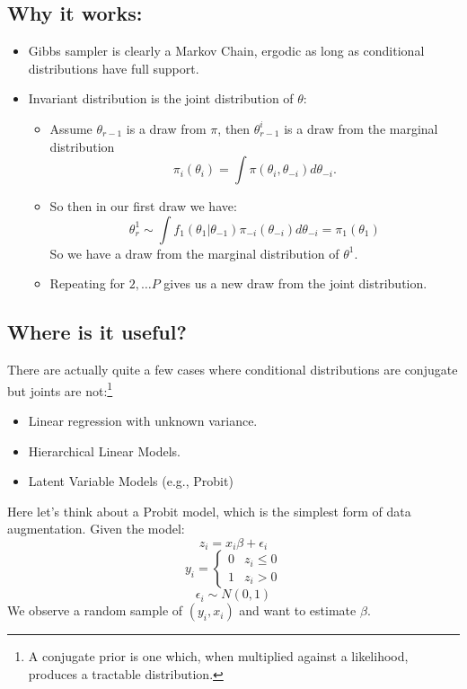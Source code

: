 \documentclass[twoside]{article}
\begin{document}
\subsection{Why it works:} 
\begin{itemize}
\item Gibbs sampler is clearly a Markov Chain, ergodic as long as conditional distributions have full support. 
\item Invariant distribution is the joint distribution of $\theta$: 
\begin{itemize}
\item Assume $\theta_{r-1}$ is a draw from $\pi$, then $\theta_{r-1}^i$ is a draw from the marginal distribution 
$$\pi_i(\theta_i) = \int \pi(\theta_i, \theta_{-i}) d\theta_{-i}.$$
\item So then in our first draw we have: 
$$\theta^1_r \sim \int f_1(\theta_1 | \theta_{-1}) \pi_{-i}(\theta_{-i}) d \theta_{-i} = \pi_1(\theta_1)$$
So we have a draw from the marginal distribution of $\theta^1$. 
\item Repeating for $2, \ldots P$ gives us a new draw from the joint distribution. 
\end{itemize}
\end{itemize}

\subsection{Where is it useful?}

There are actually quite a few cases where conditional distributions are conjugate but joints are not:\footnote{A conjugate prior is one which, when multiplied against a likelihood, produces a tractable distribution.} 
\begin{itemize}
\item Linear regression with unknown variance. 
\item Hierarchical Linear Models. 
\item Latent Variable Models (e.g., Probit) 
\end{itemize}

Here let's think about a Probit model, which is the simplest form of data augmentation. Given the model: 
$$ z_i = x_i \beta + \epsilon_i $$
$$ y_i = \begin{cases} 0 & z_i \leq 0 \\ 1 & z_i > 0 \end{cases}$$
$$ \epsilon_i \sim N(0, 1)$$
We observe a random sample of $(y_i, x_i)$ and want to estimate $\beta$. 
\end{document}
